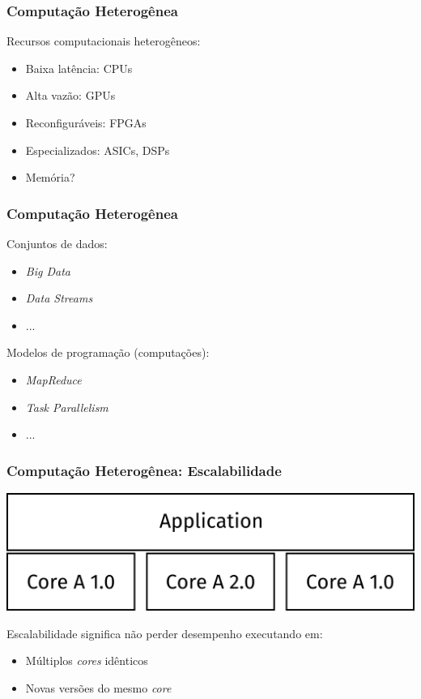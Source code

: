\documentclass[10pt, compress]{beamer}
\begin{document}
\begin{frame}
    \frametitle{Computação Heterogênea}
    Recursos computacionais \alert{heterogêneos}:
    \pause
    \begin{itemize}
        \item Baixa latência: CPUs
            \pause
        \item Alta vazão: GPUs
            \pause
        \item Reconfiguráveis: FPGAs
            \pause
        \item Especializados: ASICs, DSPs
            \pause
        \item Memória?
    \end{itemize}
\end{frame}

\begin{frame}
    \frametitle{Computação Heterogênea}
    Conjuntos de \alert{dados}:
    \begin{itemize}
        \item \textit{Big Data}
        \item \textit{Data Streams}
        \item ...
    \end{itemize}
    \pause
    Modelos de programação (\alert{computações}):
    \begin{itemize}
        \item \textit{MapReduce}
        \item \textit{Task Parallelism}
        \item ...
    \end{itemize}
\end{frame}

\begin{frame}
    \frametitle{Computação Heterogênea: Escalabilidade}
    \begin{center}
        \includegraphics[width=.7\textwidth]{scalability}
    \end{center}

    \alert{Escalabilidade} significa não perder desempenho
        executando em:
    \begin{itemize}
        \item Múltiplos \textit{cores} idênticos
            \pause
        \item Novas versões do mesmo \textit{core}
    \end{itemize}
\end{frame}
\end{document}

